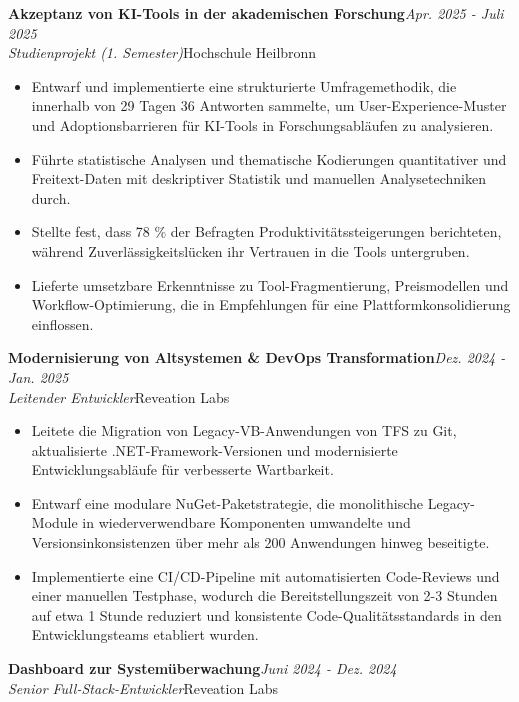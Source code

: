 \documentclass[a4paper,11pt]{article}
\newcommand{\resumeProject}[4]{%
\vspace{0.5mm}\item
    {\rightskip=0pt\relax
     \textbf{#1}\hfill\textit{\footnotesize{#3}}\\
     \footnotesize{\textit{#2}}\hfill\footnotesize{#4}\par}%
    \vspace{-2.4mm}
}
\newcommand{\resumeItemListStart}{\begin{justify}\begin{itemize}[leftmargin=3ex, rightmargin=2ex, noitemsep,labelsep=1.2mm,itemsep=0mm]\small}
\newcommand{\resumeItemListEnd}{\end{itemize}\end{justify}\vspace{-2mm}}
\begin{document}
    \vspace{-1 mm}
     \pagebreak[2]
     \resumeProject
      {Akzeptanz von KI-Tools in der akademischen Forschung}{Studienprojekt (1. Semester)}{Apr. 2025 - Juli 2025}{Hochschule Heilbronn}
      \resumeItemListStart
       \item {Entwarf und implementierte eine strukturierte Umfragemethodik, die innerhalb von 29 Tagen 36 Antworten sammelte, um User-Experience-Muster und Adoptionsbarrieren für KI-Tools in Forschungsabläufen zu analysieren.}
       \item {Führte statistische Analysen und thematische Kodierungen quantitativer und Freitext-Daten mit deskriptiver Statistik und manuellen Analysetechniken durch.}
       \item {Stellte fest, dass 78 \% der Befragten Produktivitätssteigerungen berichteten, während Zuverlässigkeitslücken ihr Vertrauen in die Tools untergruben.}
       \item {Lieferte umsetzbare Erkenntnisse zu Tool-Fragmentierung, Preismodellen und Workflow-Optimierung, die in Empfehlungen für eine Plattformkonsolidierung einflossen.}
    \resumeItemListEnd
    \vspace{-2mm}

    \vspace{-1 mm}
    \pagebreak[2]
    \resumeProject
    {Modernisierung von Altsystemen \& DevOps Transformation}{Leitender Entwickler}{Dez. 2024 - Jan. 2025}{Reveation Labs}
    \resumeItemListStart
      \item {Leitete die Migration von Legacy-VB-Anwendungen von TFS zu Git, aktualisierte .NET-Framework-Versionen und modernisierte Entwicklungsabläufe für verbesserte Wartbarkeit.}
      \item {Entwarf eine modulare NuGet-Paketstrategie, die monolithische Legacy-Module in wiederverwendbare Komponenten umwandelte und Versionsinkonsistenzen über mehr als 200 Anwendungen hinweg beseitigte.}
      \item {Implementierte eine CI/CD-Pipeline mit automatisierten Code-Reviews und einer manuellen Testphase, wodurch die Bereitstellungszeit von 2-3 Stunden auf etwa 1 Stunde reduziert und konsistente Code-Qualitätsstandards in den Entwicklungsteams etabliert wurden.}
    \resumeItemListEnd
    \vspace{-2 mm}
    
    \vspace{-1 mm}
    \pagebreak[2]
    \resumeProject
      {Dashboard zur Systemüberwachung}{Senior Full-Stack-Entwickler}{Juni 2024 - Dez. 2024}{Reveation Labs}
         
\end{document}
